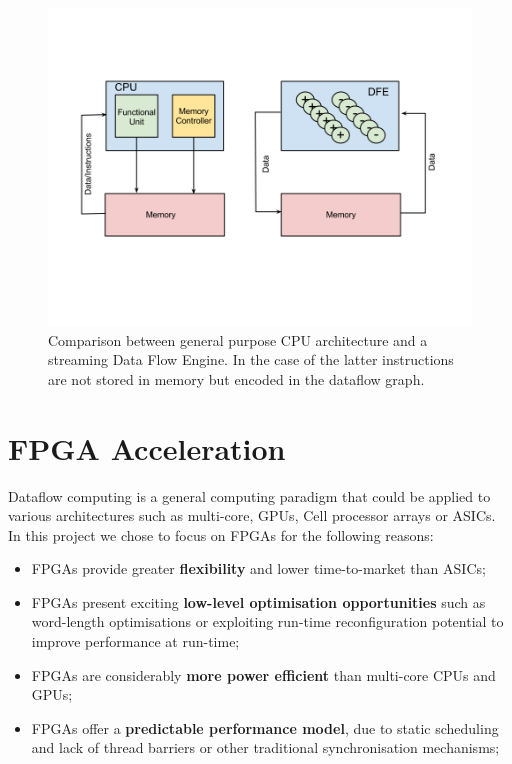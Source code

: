 \begin{figure}[h] \centering
  \includegraphics[scale=0.4, trim=0 200 0 150]{figs/cpu-vs-dfe.png}
  \caption{Comparison between general purpose CPU architecture and a
    streaming Data Flow Engine. In the case of the latter instructions are
    not stored in memory but encoded in the dataflow graph. }
  \label{fig:cpudfe}
\end{figure}


\section{FPGA Acceleration}

Dataflow computing is a general computing paradigm that could be
applied to various architectures such as multi-core, GPUs, Cell
processor arrays or ASICs. In this project we chose to focus on FPGAs
for the following reasons:
\begin{itemize}
\item FPGAs provide greater \textbf{flexibility} and lower time-to-market than
  ASICs;
\item FPGAs present exciting \textbf{low-level optimisation opportunities} such
  as word-length optimisations or exploiting run-time reconfiguration
  potential to improve performance at run-time;
\item FPGAs are considerably \textbf{more power efficient} than multi-core CPUs
  and GPUs;
\item FPGAs offer a \textbf{predictable performance model}, due to static
  scheduling and lack of thread barriers or other traditional
  synchronisation mechanisms;
\end{itemize}


